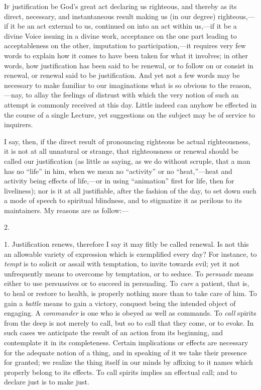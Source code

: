 
I\textsc{f} justification be God's great act declaring us righteous,
and thereby as its direct, necessary, and instantaneous result making
us (in our degree) righteous,—if it be an act external to us,
continued on into an act within us,—if it be a divine Voice issuing
in a divine work, acceptance on the one part leading to acceptableness
on the other, imputation to participation,—it requires very few
words to explain how it comes to have been taken for what it involves;
in other words, how justification has been said to be renewal, or to
follow on or consist in renewal, or renewal said to be justification.
And yet not a few words may be necessary to make familiar to our
imaginations what is so obvious to the reason,—nay, to allay the
feelings of distrust with which the very notion of such an attempt is
commonly received at this day. Little indeed can anyhow be effected in
the course of a single Lecture, yet suggestions on the subject may be
of service to inquirers.

I say, then, if the direct result of pronouncing righteous be
actual righteousness, it is not at all unnatural or strange, that
righteousness or renewal should be called our justification (as little
as saying, as we do without scruple, that a man has no
``life'' in him, when we mean no ``activity'' or
no ``heat,''—heat and activity being effects of life,—or
in using ``animation'' first for life, then for liveliness);
nor is it at all justifiable, after the fashion of the day, to set
down such a mode of speech to spiritual blindness, and to stigmatize
it as perilous to its maintainers. My reasons are as follow:—

2.

1. Justification renews, therefore I say it may fitly be called
renewal. Is not this an allowable variety of expression which is
exemplified every day? For instance, to \emph{tempt} is to solicit or
assail with temptation, to invite towards evil; yet it not
unfrequently means to overcome by temptation, or to seduce. To \emph{persuade}
means either to use persuasives or to succeed in persuading. To \emph{cure}
a patient, that is, to heal or restore to health, is properly nothing
more than to take care of him. To gain a \emph{battle} means to gain a
victory, conquest being the intended object of engaging. A \emph{commander}
is one who is obeyed as well as commands. To \emph{call} spirits from
the deep is not merely to call, but so to call that they come, or to
evoke. In such cases we anticipate the result of an action from its
beginning, and contemplate it in its completeness. Certain
implications or effects are necessary for the adequate notion of a
thing, and in speaking of it we take their presence for granted; we
realize the thing itself in our minds by affixing to it names which
properly belong to its effects. To call spirits implies an effectual
call; and to declare just is to make just.

